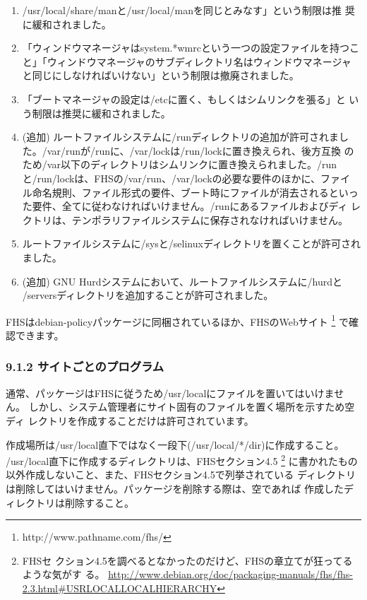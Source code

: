 \documentclass[mingoth,a4paper]{jsarticle}
\begin{document}
\begin{enumerate}
\item /usr/local/share/manと/usr/local/manを同じとみなす」という制限は推
      奨に緩和されました。
\item「ウィンドウマネージャはsystem.*wmrcという一つの設定ファイルを持つこ
      と」「ウィンドウマネージャのサブディレクトリ名はウィンドウマネージャ
      と同じにしなければいけない」という制限は撤廃されました。
\item 「ブートマネージャの設定は/etcに置く、もしくはシムリンクを張る」と
      いう制限は推奨に緩和されました。
\item (追加) ルートファイルシステムに/runディレクトリの追加が許可されまし
      た。/var/runが/runに、/var/lockは/run/lockに置き換えられ、後方互換
      のため/var以下のディレクトリはシムリンクに置き換えられました。/run
      と/run/lockは、FHSの/var/run、/var/lockの必要な要件のほかに、ファイ
      ル命名規則、ファイル形式の要件、ブート時にファイルが消去されるといっ
      た要件、全てに従わなければいけません。/runにあるファイルおよびディ
      レクトリは、テンポラリファイルシステムに保存されなければいけません。
\item ルートファイルシステムに/sysと/selinuxディレクトリを置くことが許可されました。
\item (追加) GNU Hurdシステムにおいて、ルートファイルシステムに/hurdと
      /serversディレクトリを追加することが許可されました。
\end{enumerate}

FHSはdebian-policyパッケージに同梱されているほか、FHSのWebサイト
\footnote{http://www.pathname.com/fhs/} で確認できます。

\subsubsection{9.1.2 サイトごとのプログラム}

通常、パッケージはFHSに従うため/usr/localにファイルを置いてはいけません。
しかし、システム管理者にサイト固有のファイルを置く場所を示すため空ディ
レクトリを作成することだけは許可されています。

作成場所は/usr/local直下ではなく一段下(/usr/local/*/dir)に作成すること。
/usr/local直下に作成するディレクトリは、FHSセクション4.5 \footnote{FHSセ
クション4.5を調べるとなかったのだけど、FHSの章立てが狂ってるような気がす
る。
\url{http://www.debian.org/doc/packaging-manuals/fhs/fhs-2.3.html\#USRLOCALLOCALHIERARCHY}}
に書かれたもの以外作成しないこと、また、FHSセクション4.5で列挙されている
ディレクトリは削除してはいけません。パッケージを削除する際は、空であれば
作成したディレクトリは削除すること。
\end{document}
